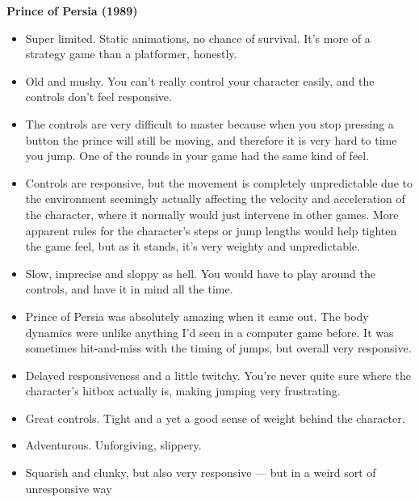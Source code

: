 \textbf{Prince of Persia (1989)}
\vspace{-5mm}
\begin{itemize}[noitemsep,nolistsep]
\item Super limited. Static animations, no chance of survival. It's more of a strategy game than a platformer, honestly.
\item Old and mushy. You can't really control your character easily, and the controls don't feel responsive.
\item The controls are very difficult to master because when you stop pressing a button the prince will still be moving, and therefore it is very hard to time you jump. One of the rounds in your game had the same kind of feel.
\item Controls are responsive, but the movement is completely unpredictable due to the environment seemingly actually affecting the velocity and acceleration of the character, where it normally would just intervene in other games. More apparent rules for the character's steps or jump lengths would help tighten the game feel, but as it stands, it's very weighty and unpredictable.
\item Slow, imprecise and sloppy as hell. You would have to play around the controls, and have it in mind all the time.
\item Prince of Persia was absolutely amazing when it came out. The body dynamics were unlike anything I'd seen in a computer game before. It was sometimes hit-and-miss with the timing of jumps, but overall very responsive.
\item Delayed responsiveness and a little twitchy. You're never quite sure where the character's hitbox actually is, making jumping very frustrating.
\item Great controls. Tight and a yet a good sense of weight behind the character.
\item Adventurous. Unforgiving, slippery.
\item Squarish and clunky, but also very responsive --- but in a weird sort of unresponsive way
\end{itemize}

